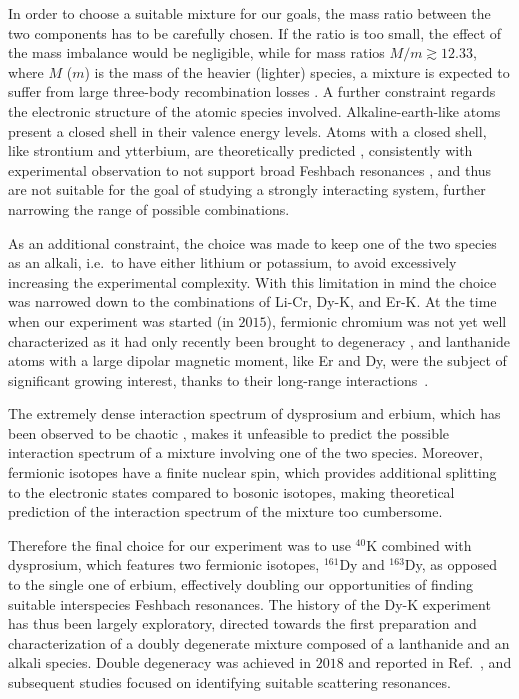 In order to choose a suitable mixture for our goals, the mass ratio between the two components has to be carefully chosen. If the ratio is too small, the effect of the mass imbalance would be negligible, while for mass ratios $M/m\gtrsim12.33$, where $M$ ($m$) is the mass of the heavier (lighter) species, a mixture is expected to suffer from large three-body recombination losses \cite{Petrov2005dmi}. A further constraint regards the electronic structure of the atomic species involved. Alkaline-earth-like atoms present a closed shell in their valence energy levels. Atoms with a closed shell, like strontium and ytterbium, are theoretically predicted \cite{Mukherjee2022fra}, consistently with experimental observation \cite{Green2020fri, Barbe2018oof} to not support broad Feshbach resonances , and thus are not suitable for the goal of studying a strongly interacting system, further narrowing the range of possible combinations. 
  
As an additional constraint, the choice was made to keep one of the two species as an alkali, i.e.~to have either lithium or potassium, to avoid excessively increasing the experimental complexity. With this limitation in mind the choice was narrowed down to the combinations of Li-Cr, Dy-K, and Er-K. At the time when our experiment was started (in $2015$), fermionic chromium was not yet well characterized as it had only recently been brought to degeneracy \cite{Naylor2015cdf}, and lanthanide atoms with a large dipolar magnetic moment, like Er and Dy, were the subject of significant growing interest,  thanks to their long-range interactions~\cite{Chomaz2022dpa}.

The extremely dense interaction spectrum of dysprosium and erbium, which has been observed to be chaotic \cite{Maier2015eoc, Maier2015buf}, makes it unfeasible to predict the possible interaction spectrum of a mixture involving one of the two species. Moreover, fermionic isotopes have a finite nuclear spin, which provides additional splitting to the electronic states compared to bosonic isotopes, making theoretical prediction of the interaction spectrum of the mixture too cumbersome. 

Therefore the final choice for our experiment was to use $^{40}$K combined with dysprosium, which features two fermionic isotopes, $^{161}$Dy and $^{163}$Dy, as opposed to the single one of erbium, effectively doubling our opportunities of finding suitable interspecies Feshbach resonances. The history of the Dy-K experiment has thus been largely exploratory, directed towards the first preparation and characterization of a doubly degenerate mixture composed of a lanthanide and an alkali species. Double degeneracy was achieved in $2018$ and reported in Ref.~\cite{Ravensbergen2018poa}, and subsequent studies focused on identifying suitable scattering resonances.

